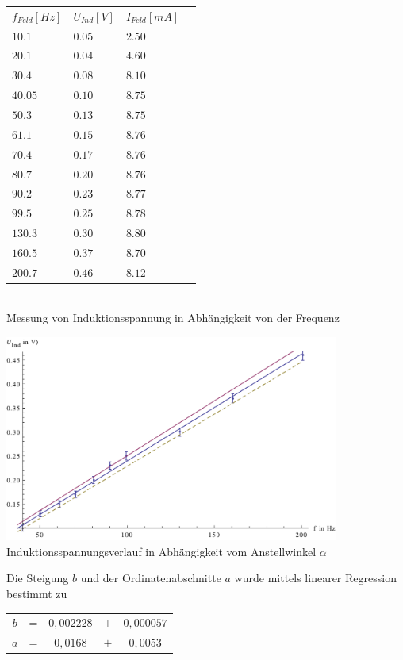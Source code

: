 \documentclass{article}
\begin{document}
\begin{center}

\begin{tabular}{l l l l}
\(f_{Feld}[Hz]\) & \(U_{Ind}[V]\) & \(I_{Feld}[mA]\) \\
\(10.1\) & \(0.05\) & \(2.50\) \\
\(20.1\) & \(0.04\) & \(4.60\) \\
\(30.4\) & \(0.08\) & \(8.10\) \\
\(40.05\) & \(0.10\) & \(8.75\) \\
\(50.3\) & \(0.13\) & \(8.75\) \\
\(61.1\) & \(0.15\) & \(8.76\) \\
\(70.4\) & \(0.17\) & \(8.76\) \\
\(80.7\) & \(0.20\) & \(8.76\) \\
\(90.2\) & \(0.23\) & \(8.77\) \\
\(99.5\) & \(0.25\) & \(8.78\) \\
\(130.3\) & \(0.30\) & \(8.80\) \\
\(160.5\) & \(0.37\) & \(8.70\) \\
\(200.7\) & \(0.46\) & \(8.12\) \\
\end{tabular}\\
Messung von Induktionsspannung in Abhängigkeit von der Frequenz\\
\end{center}
\begin{center}
  \includegraphics[width=11cm]{graph3}
	Induktionsspannungsverlauf in Abhängigkeit vom Anstellwinkel \( \alpha \)
\end{center}

Die Steigung \(b\) und der Ordinatenabschnitte \(a\) wurde mittels linearer Regression bestimmt zu

\begin{center}
\begin{tabular}{c c c c c} 
  \(b\) & = & \(0,002228\) & \(\pm \) & \(0,000057 \) \\ 
  \(a\) & = & \(0,0168\) & \(\pm \) & \(0,0053 \) \\ 

 \end{tabular}
\end{center}
\end{document}

